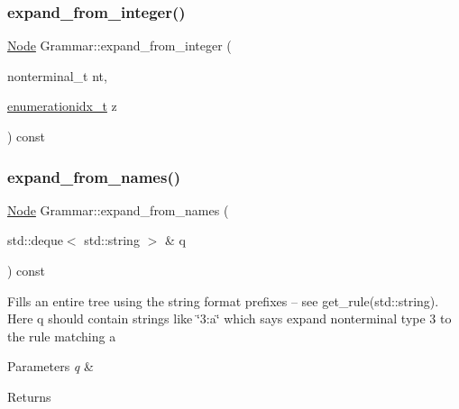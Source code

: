 \mbox{\label{class_grammar_a7b478d4ad5955b7489074e106afce5a4}} 
\subsubsection{\texorpdfstring{expand\+\_\+from\+\_\+integer()}{expand\_from\_integer()}\hspace{0.1cm}{\footnotesize\ttfamily [2/2]}}
{\footnotesize\ttfamily \hyperlink{class_node}{Node} Grammar\+::expand\+\_\+from\+\_\+integer (\begin{DoxyParamCaption}\item[{nonterminal\+\_\+t}]{nt,  }\item[{\hyperlink{_numerics_8h_a9fe2bbca873b046b2bd276fc6856bb88}{enumerationidx\+\_\+t}}]{z }\end{DoxyParamCaption}) const\hspace{0.3cm}{\ttfamily [inline]}}

\mbox{\label{class_grammar_ab5bd3d35545bcab4dbd3ca1d136bd4ce}} 
\subsubsection{\texorpdfstring{expand\+\_\+from\+\_\+names()}{expand\_from\_names()}\hspace{0.1cm}{\footnotesize\ttfamily [1/3]}}
{\footnotesize\ttfamily \hyperlink{class_node}{Node} Grammar\+::expand\+\_\+from\+\_\+names (\begin{DoxyParamCaption}\item[{std\+::deque$<$ std\+::string $>$ \&}]{q }\end{DoxyParamCaption}) const\hspace{0.3cm}{\ttfamily [inline]}}

Fills an entire tree using the string format prefixes -- see get\+\_\+rule(std\+::string). Here q should contain strings like \char`\"{}3\+:\textquotesingle{}a\textquotesingle{}\char`\"{} which says expand nonterminal type 3 to the rule matching \textquotesingle{}a\textquotesingle{} 
\begin{DoxyParams}{Parameters}
{\em q} & \\
\hline
\end{DoxyParams}
\begin{DoxyReturn}{Returns}

\end{DoxyReturn}
\mbox{\label{class_grammar_a44954a36c11d58c23bef02ca7d541005}} 
